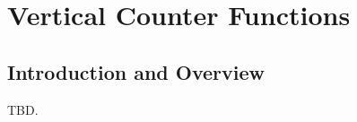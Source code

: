 \chapter{Vertical Counter Functions}
\label{cvco0}

\section{Introduction and Overview}
\label{cvco0:siov0}

TBD.

